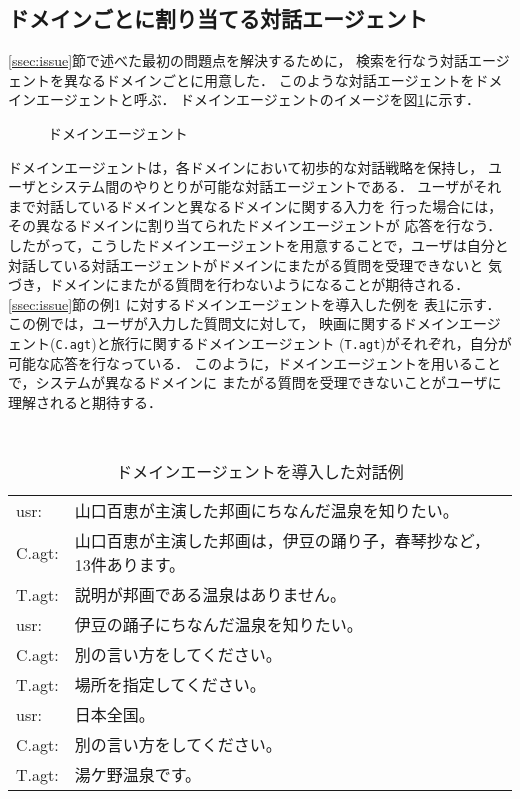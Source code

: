 \subsection{ドメインごとに割り当てる対話エージェント}
\ref{ssec:issue}節で述べた最初の問題点を解決するために，
検索を行なう対話エージェントを異なるドメインごとに用意した．
このような対話エージェントをドメインエージェントと呼ぶ．
ドメインエージェントのイメージを図\ref{fig:agentD}に示す．

\begin{figure}[htbp]
\begin{center}
\end{center}
\caption{ドメインエージェント}\label{fig:agentD}
\end{figure}
ドメインエージェントは，各ドメインにおいて初歩的な対話戦略を保持し，
ユーザとシステム間のやりとりが可能な対話エージェントである．
ユーザがそれまで対話しているドメインと異なるドメインに関する入力を
行った場合には，その異なるドメインに割り当てられたドメインエージェントが
応答を行なう．
したがって，こうしたドメインエージェントを用意することで，ユーザは自分と
対話している対話エージェントがドメインにまたがる質問を受理できないと
気づき，ドメインにまたがる質問を行わないようになることが期待される．
\ref{ssec:issue}節の例1 に対するドメインエージェントを導入した例を
表\ref{tab:d-agent}に示す．この例では，ユーザが入力した質問文に対して，
映画に関するドメインエージェント({\tt C.agt})と旅行に関するドメインエージェント
({\tt T.agt})がそれぞれ，自分が可能な応答を行なっている．
このように，ドメインエージェントを用いることで，システムが異なるドメインに
またがる質問を受理できないことがユーザに理解されると期待する．

\begin{table}[ht]
\caption{ドメインエージェントを導入した対話例}\label{tab:d-agent}
\bigskip
\centering \tt
\begin{tabular}{ll}
\hline\hline
usr: & 山口百恵が主演した邦画にちなんだ温泉を知りたい。\\
C.agt: & 山口百恵が主演した邦画は，伊豆の踊り子，春琴抄など，13件あります。\\
T.agt: & 説明が邦画である温泉はありません。\\
usr: & 伊豆の踊子にちなんだ温泉を知りたい。\\
C.agt: & 別の言い方をしてください。\\
T.agt: & 場所を指定してください。\\
usr: & 日本全国。\\
C.agt: & 別の言い方をしてください。\\
T.agt: & 湯ケ野温泉です。\\
\hline\hline
\end{tabular}
\end{table}

